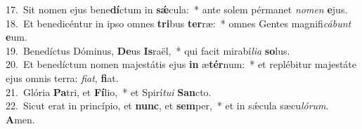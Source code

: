 {17.~}Sit nomen ejus bene\textbf{dí}ctum in \textbf{sǽ}cula:~* ante solem pérmanet \textit{no}\textit{men} \textbf{e}jus.\\
{18.~}Et benedicéntur in ipso omnes \textbf{tri}bus \textbf{ter}ræ:~* omnes Gentes magnifi\textit{cá}\textit{bunt} \textbf{e}um.\\
{19.~}Benedíctus Dóminus, \textbf{De}us \textbf{Is}raël,~* qui facit mirabí\textit{li}\textit{a} \textbf{so}lus.\\
{20.~}Et benedíctum nomen majestátis ejus \textbf{in} æ\textbf{tér}num:~* et replébitur majestáte ejus omnis terra: \textit{fi}\textit{at}, \textbf{fi}at.\\
{21.~}Glória \textbf{Pa}tri, et \textbf{Fí}lio,~* et Spirí\textit{tu}\textit{i} \textbf{San}cto.\\
{22.~}Sicut erat in princípio, et \textbf{nunc}, et \textbf{sem}per,~* et in sǽcula sæcu\textit{ló}\textit{rum}. \textbf{A}men.\\
